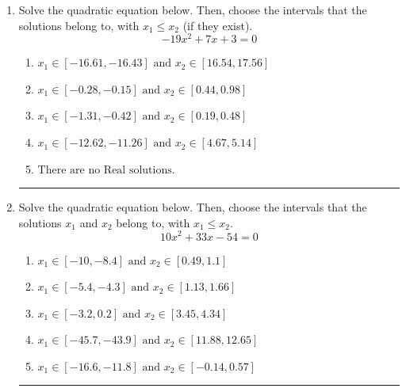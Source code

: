 \documentclass[14pt]{extbook}
\newcommand{\litem}[1]{\item#1\hspace*{-1cm}\rule{\textwidth}{0.4pt}}
\begin{document}
\begin{enumerate}
\litem{
Solve the quadratic equation below. Then, choose the intervals that the solutions belong to, with $x_1 \leq x_2$ (if they exist).\[ -19x^{2} +7 x + 3 = 0 \]\begin{enumerate}[label=\Alph*.]
\item \( x_1 \in [-16.61, -16.43] \text{ and } x_2 \in [16.54, 17.56] \)
\item \( x_1 \in [-0.28, -0.15] \text{ and } x_2 \in [0.44, 0.98] \)
\item \( x_1 \in [-1.31, -0.42] \text{ and } x_2 \in [0.19, 0.48] \)
\item \( x_1 \in [-12.62, -11.26] \text{ and } x_2 \in [4.67, 5.14] \)
\item \( \text{There are no Real solutions.} \)

\end{enumerate} }
\litem{
Solve the quadratic equation below. Then, choose the intervals that the solutions $x_1$ and $x_2$ belong to, with $x_1 \leq x_2$.\[ 10x^{2} +33 x -54 = 0 \]\begin{enumerate}[label=\Alph*.]
\item \( x_1 \in [-10, -8.4] \text{ and } x_2 \in [0.49, 1.1] \)
\item \( x_1 \in [-5.4, -4.3] \text{ and } x_2 \in [1.13, 1.66] \)
\item \( x_1 \in [-3.2, 0.2] \text{ and } x_2 \in [3.45, 4.34] \)
\item \( x_1 \in [-45.7, -43.9] \text{ and } x_2 \in [11.88, 12.65] \)
\item \( x_1 \in [-16.6, -11.8] \text{ and } x_2 \in [-0.14, 0.57] \)


\end{enumerate}}
\end{enumerate}
\end{document}
